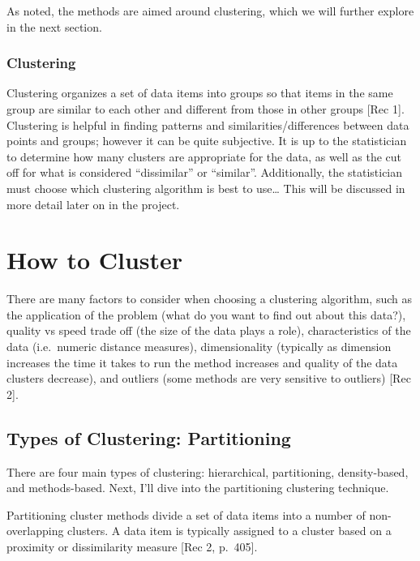 \documentclass[12pt,twoside]{amherstthesis}
\begin{document}
  As noted, the methods are aimed around clustering, which we will further
  explore in the next section.
  
  \subsection{Clustering}\label{clustering}
  
  Clustering organizes a set of data items into groups so that items in
  the same group are similar to each other and different from those in
  other groups {[}Rec 1{]}. Clustering is helpful in finding patterns and
  similarities/differences between data points and groups; however it can
  be quite subjective. It is up to the statistician to determine how many
  clusters are appropriate for the data, as well as the cut off for what
  is considered ``dissimilar'' or ``similar''. Additionally, the
  statistician must choose which clustering algorithm is best to
  use\ldots{} This will be discussed in more detail later on in the
  project.
  
  \chapter{How to Cluster}\label{rmd-basics}
  
  There are many factors to consider when choosing a clustering algorithm,
  such as the application of the problem (what do you want to find out
  about this data?), quality vs speed trade off (the size of the data
  plays a role), characteristics of the data (i.e.~numeric distance
  measures), dimensionality (typically as dimension increases the time it
  takes to run the method increases and quality of the data clusters
  decrease), and outliers (some methods are very sensitive to outliers)
  {[}Rec 2{]}.
  
  \section{Types of Clustering:
  Partitioning}\label{types-of-clustering-partitioning}
  
  There are four main types of clustering: hierarchical, partitioning,
  density-based, and methods-based. Next, I'll dive into the partitioning
  clustering technique.
  
  Partitioning cluster methods divide a set of data items into a number of
  non-overlapping clusters. A data item is typically assigned to a cluster
  based on a proximity or dissimilarity measure {[}Rec 2, p.~405{]}.
  
\end{document}
